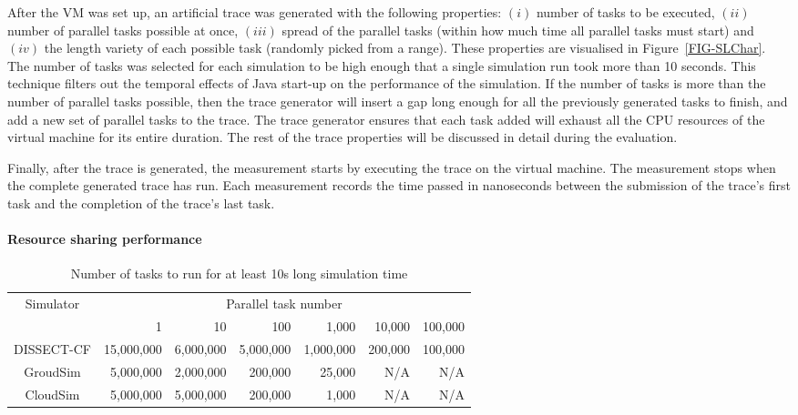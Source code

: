 \documentclass[sort, compress, 5p]{elsarticle}
\begin{document}
After the VM was set up, an artificial trace was generated with the following properties: $(i)$ number of tasks to be executed, $(ii)$ number of parallel tasks possible at once, $(iii)$ spread of the parallel tasks (within how much time all parallel tasks must start) and $(iv)$ the length variety of each possible task (randomly picked from a range). These properties are visualised in Figure~\ref{FIG-SLChar}. The number of tasks was selected for each simulation to be high enough that a single simulation run took more than 10 seconds. This technique filters out the temporal effects of Java start-up on the performance of the simulation. If the number of tasks is more than the number of parallel tasks possible, then the trace generator will insert a gap long enough for all the previously generated tasks to finish, and add a new set of parallel tasks to the trace. The trace generator ensures that each task added will exhaust all the CPU resources of the virtual machine for its entire duration. The rest of the trace properties will be discussed in detail during the evaluation.

Finally, after the trace is generated, the measurement starts by executing the trace on the virtual machine. The measurement stops when the complete generated trace has run. Each measurement records the time passed in nanoseconds between the submission of the trace's first task and the completion of the trace's last task.

\paragraph{Resource sharing performance}

\begin{table*}[tb]
\centering
\caption{Number of tasks to run for at least 10s long simulation time\label{TAB-TASKDISTRS}}
\begin{tabular}{c|rrrrrr}
\hline
\multirow{2}{*}{Simulator}& \multicolumn{6}{c}{Parallel task number}\\
& 1 & 10 & 100 & 1,000 & 10,000 & 100,000\\
\hline
DISSECT-CF & 15,000,000 & 6,000,000 & 5,000,000 & 1,000,000 & 200,000 & 100,000\\
GroudSim & 5,000,000 & 2,000,000 & 200,000 & 25,000 & N/A & N/A\\
CloudSim & 5,000,000 & 5,000,000 & 200,000 & 1,000 & N/A & N/A\\
\hline
\end{tabular}
\end{table*}
\end{document}
